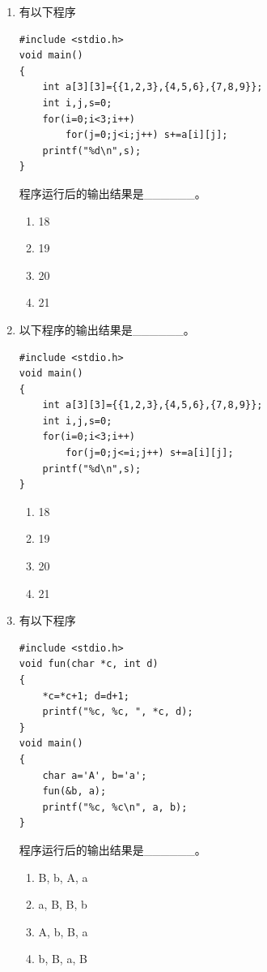 \documentclass[a4paper,12pt]{article}
\begin{document}
\begin{enumerate}
	\item 有以下程序
	      \begin{verbatim}
#include <stdio.h>
void main()
{
    int a[3][3]={{1,2,3},{4,5,6},{7,8,9}};
    int i,j,s=0;
    for(i=0;i<3;i++)
        for(j=0;j<i;j++) s+=a[i][j];
    printf("%d\n",s);
}
    \end{verbatim}
	      程序运行后的输出结果是\_\_\_\_\_\_。
	      \begin{enumerate}
		      \item[A)] 18
		      \item[B)] 19
		      \item[C)] 20
		      \item[D)] 21
	      \end{enumerate}
	      \vspace{0.3cm}

	\item 以下程序的输出结果是\_\_\_\_\_\_。
	      \begin{verbatim}
#include <stdio.h>
void main()
{
    int a[3][3]={{1,2,3},{4,5,6},{7,8,9}};
    int i,j,s=0;
    for(i=0;i<3;i++)
        for(j=0;j<=i;j++) s+=a[i][j];
    printf("%d\n",s);
}
    \end{verbatim}
	      \begin{enumerate}
		      \item[A)] 18
		      \item[B)] 19
		      \item[C)] 20
		      \item[D)] 21
	      \end{enumerate}
	      \vspace{0.3cm}

	\item 有以下程序
	      \begin{verbatim}
#include <stdio.h>
void fun(char *c, int d)
{
    *c=*c+1; d=d+1;
    printf("%c, %c, ", *c, d);
}
void main()
{
    char a='A', b='a';
    fun(&b, a);
    printf("%c, %c\n", a, b);
}
    \end{verbatim}
	      程序运行后的输出结果是\_\_\_\_\_\_。
	      \begin{enumerate}
		      \item[A)] B, b, A, a
		      \item[B)] a, B, B, b
		      \item[C)] A, b, B, a
		      \item[D)] b, B, a, B
	      \end{enumerate}
	      \vspace{0.3cm}


\end{enumerate}
\end{document}
